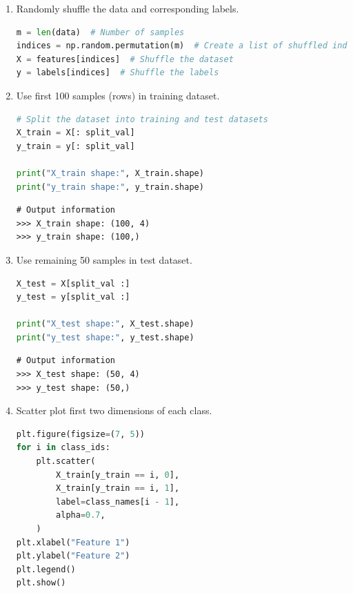 \documentclass[11pt,a4paper]{article}
\begin{document}
\begin{enumerate}[leftmargin=*]
\item Randomly shuffle the data and corresponding labels.

\begin{lstlisting}[language=Python]
m = len(data)  # Number of samples
indices = np.random.permutation(m)  # Create a list of shuffled indices from 0 to m-1
X = features[indices]  # Shuffle the dataset
y = labels[indices]  # Shuffle the labels
\end{lstlisting}

\fancyhf{} %

\item Use first 100 samples (rows) in training dataset.

\begin{lstlisting}[language=Python]
# Split the dataset into training and test datasets
X_train = X[: split_val]
y_train = y[: split_val]

print("X_train shape:", X_train.shape)
print("y_train shape:", y_train.shape)
\end{lstlisting}

\begin{lstlisting}[numbers=none, framexleftmargin=2mm, xleftmargin=2mm, framexrightmargin=2mm, xrightmargin=2mm]
# Output information
>>> X_train shape: (100, 4)
>>> y_train shape: (100,)
\end{lstlisting}

  \item Use remaining 50 samples in test dataset.

\begin{lstlisting}[language=Python]
X_test = X[split_val :]
y_test = y[split_val :]

print("X_test shape:", X_test.shape)
print("y_test shape:", y_test.shape)
\end{lstlisting}

\begin{lstlisting}[numbers=none, framexleftmargin=2mm, xleftmargin=2mm, framexrightmargin=2mm, xrightmargin=2mm]
# Output information
>>> X_test shape: (50, 4)
>>> y_test shape: (50,)
\end{lstlisting}

\item Scatter plot first two dimensions of each class.

\begin{lstlisting}[language=Python]
plt.figure(figsize=(7, 5))
for i in class_ids:
    plt.scatter(
        X_train[y_train == i, 0],
        X_train[y_train == i, 1],
        label=class_names[i - 1],
        alpha=0.7,
    )
plt.xlabel("Feature 1")
plt.ylabel("Feature 2")
plt.legend()
plt.show()
\end{lstlisting}


\end{enumerate}
\end{document}
